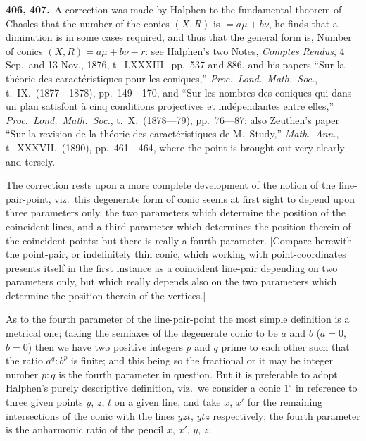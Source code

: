 \documentclass[11pt,a4paper]{article}
\theoremstyle{plain}
\theoremstyle{definition}
\theoremstyle{remark}
\begin{document}
\smallskip

\noindent\textbf{406, 407.}\ A correction was made by Halphen to the fundamental theorem of Chasles that the number of the conics $(X,R)$ is $=a\mu+b\nu$, he finds that a diminution is in some cases required, and thus that the general form is, Number of conics $(X,R)=a\mu+b\nu-r$: see Halphen's two Notes, \textit{Comptes Rendus}, 4 Sep.\ and 13 Nov., 1876, t.~LXXXIII.\ pp.~537 and 886, and his papers ``Sur la th\'{e}orie des caract\'{e}ristiques pour les coniques,'' \textit{Proc.\ Lond.\ Math.\ Soc.}, t.~IX.\ (1877---1878), pp.~149---170, and ``Sur les nombres des coniques qui dans un plan satisfont \`{a} cinq conditions projectives et ind\'{e}pendantes entre elles,'' \textit{Proc.\ Lond.\ Math.\ Soc.}, t.~X.\ (1878---79), pp.~76---87: also Zeuthen's paper ``Sur la revision de la th\'{e}orie des caract\'{e}ristiques de M.\ Study,'' \textit{Math.\ Ann.}, t.~XXXVII.\ (1890), pp.~461---464, where the point is brought out very clearly and tersely.

The correction rests upon a more complete development of the notion of the line-pair-point, viz.\ this degenerate form of conic seems at first sight to depend upon three parameters only, the two parameters which determine the position of the coincident lines, and a third parameter which determines the position therein of the coincident points: but there is really a fourth parameter. [Compare herewith the point-pair, or indefinitely thin conic, which working with point-coordinates presents itself in the first instance as a coincident line-pair depending on two parameters only, but which really depends also on the two parameters which determine the position therein of the vertices.]

As to the fourth parameter of the line-pair-point the most simple definition is a metrical one; taking the semiaxes of the degenerate conic to be $a$ and $b$ ($a=0$, $b=0$) then we have two positive integers $p$ and $q$ prime to each other such that the ratio $a^q:b^p$ is finite; and this being so the fractional or it may be integer number $p:q$ is the fourth parameter in question. But it is preferable to adopt Halphen's purely descriptive definition, viz.\ we consider a conic $1^{\circ}$ in reference to three given points $y$, $z$, $t$ on a given line, and take $x$, $x'$ for the remaining intersections of the conic with the lines $yzt$, $ytz$ respectively; the fourth parameter is the anharmonic ratio of the pencil $x$, $x'$, $y$, $z$.

\newpage
\setcounter{page}{623}
\end{document}
